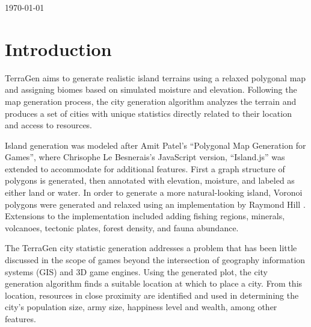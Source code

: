 \begin{titlepage}

{\large \today}\\[3cm] %


 

\vfill %

\end{titlepage}

\section{Introduction}

TerraGen aims to generate realistic island terrains using a relaxed polygonal map and assigning biomes based on simulated moisture and elevation. Following the map generation process, the city generation algorithm analyzes the terrain and produces a  set of cities with unique statistics directly related to their location and access to resources. 

Island generation was modeled after Amit Patel's ``Polygonal Map Generation for Games''\cite{Patel:2010:Online}, where Chrisophe Le Besnerais's JavaScript version, ``Island.js''\cite{LeBesnec:2015:Online} was extended to accommodate for additional features. First a graph structure of polygons is generated, then annotated with elevation, moisture, and labeled as either land or water. In order to generate a more natural-looking island, Voronoi polygons were generated and relaxed using an implementation by Raymond Hill \cite{Hill:2015:Online}. Extensions to the implementation included adding fishing regions, minerals, volcanoes, tectonic plates, forest density, and fauna abundance. 

The TerraGen city statistic generation addresses a problem that has been little discussed in the scope of games beyond the intersection of geography information systems (GIS) and 3D game engines. Using the generated plot, the city generation algorithm finds a suitable location at which to place a city. From this location, resources in close proximity are identified and used in determining the city's population size, army size, happiness level and wealth, among other features. 

